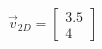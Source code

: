 \documentclass[preview]{standalone}
\begin{document}
\begin{align*}
\vec{v}_{2D} = \begin{bmatrix} 3.5 \\ 4 \end{bmatrix}
\end{align*}
\end{document}
